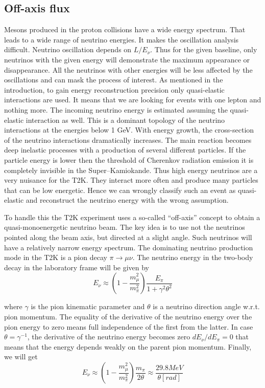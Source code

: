\documentclass[../main.tex]{subfiles}
\begin{document}
\subsection{Off-axis flux}
\label{sec:T2K:oa_flux}
Mesons produced in the proton collisions have a wide energy spectrum. That leads to a wide range of neutrino energies. It makes the oscillation analysis difficult. Neutrino oscillation depends on $L/E_\nu$. Thus for the given baseline, only neutrinos with the given energy will demonstrate the maximum appearance or disappearance. All the neutrinos with other energies will be less affected by the oscillations and can mask the process of interest. As mentioned in the introduction, to gain energy reconstruction precision only quasi-elastic interactions are used. It means that we are looking for events with one lepton and nothing more. The incoming neutrino energy is estimated assuming the quasi-elastic interaction as well. This is a dominant topology of the neutrino interactions at the energies below 1 GeV. With energy growth, the cross-section of the neutrino interactions dramatically increases. The main reaction becomes deep inelastic processes with a production of several different particles. If the particle energy is lower then the threshold of Cherenkov radiation emission it is completely invisible in the Super--Kamiokande. Thus high energy neutrinos are a very nuisance for the T2K. They interact more often and produce many particles that can be low energetic. Hence we can wrongly classify such an event as quasi-elastic and reconstruct the neutrino energy with the wrong assumption.

To handle this the T2K experiment uses a so-called ``off-axis'' concept to obtain a quasi-monoenergetic neutrino beam. The key idea is to use not the neutrinos pointed along the beam axis, but directed at a slight angle. Such neutrinos will have a relatively narrow energy spectrum. The dominating neutrino production mode in the T2K is a pion decay $\pi\to\mu\nu$. The neutrino energy in the two-body decay in the laboratory frame will be given by
\begin{equation}
E_\nu\approx\left(1-\frac{m_\mu^2}{m_\pi^2}\right)\frac{E_\pi}{1+\gamma^2\theta^2}
\end{equation}

where $\gamma$ is the pion kinematic parameter and $\theta$ is a neutrino direction angle w.r.t. pion momentum. The equality of the derivative of the neutrino energy over the pion energy to zero means full independence of the first from the latter. In case $\theta=\gamma^{-1}$, the derivative of the neutrino energy becomes zero $dE_\nu/dE_\pi=0$ that means that the energy depends weakly on the parent pion momentum. Finally, we will get
\begin{equation}
E_\nu\approx\left(1-\frac{m_\mu^2}{m_\pi^2}\right)\frac{m_\pi}{2\theta}\approx\frac{29.8MeV}{\theta\left[rad\right]}
\end{equation}
\end{document}
